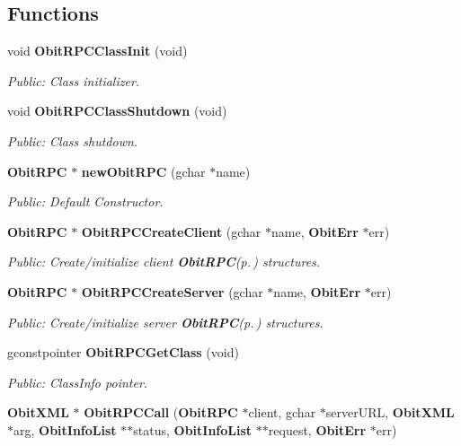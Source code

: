 \subsection*{Functions}
\begin{CompactItemize}
\item 
void {\bf Obit\-RPCClass\-Init} (void)
\begin{CompactList}\small\item\em Public: Class initializer. \item\end{CompactList}\item 
void {\bf Obit\-RPCClass\-Shutdown} (void)
\begin{CompactList}\small\item\em Public: Class shutdown. \item\end{CompactList}\item 
{\bf Obit\-RPC} $\ast$ {\bf new\-Obit\-RPC} (gchar $\ast$name)
\begin{CompactList}\small\item\em Public: Default Constructor. \item\end{CompactList}\item 
{\bf Obit\-RPC} $\ast$ {\bf Obit\-RPCCreate\-Client} (gchar $\ast$name, {\bf Obit\-Err} $\ast$err)
\begin{CompactList}\small\item\em Public: Create/initialize client {\bf Obit\-RPC}{\rm (p.\,\pageref{structObitRPC})} structures. \item\end{CompactList}\item 
{\bf Obit\-RPC} $\ast$ {\bf Obit\-RPCCreate\-Server} (gchar $\ast$name, {\bf Obit\-Err} $\ast$err)
\begin{CompactList}\small\item\em Public: Create/initialize server {\bf Obit\-RPC}{\rm (p.\,\pageref{structObitRPC})} structures. \item\end{CompactList}\item 
gconstpointer {\bf Obit\-RPCGet\-Class} (void)
\begin{CompactList}\small\item\em Public: Class\-Info pointer. \item\end{CompactList}\item 
{\bf Obit\-XML} $\ast$ {\bf Obit\-RPCCall} ({\bf Obit\-RPC} $\ast$client, gchar $\ast$server\-URL, {\bf Obit\-XML} $\ast$arg, {\bf Obit\-Info\-List} $\ast$$\ast$status, {\bf Obit\-Info\-List} $\ast$$\ast$request, {\bf Obit\-Err} $\ast$err)

\end{CompactItemize}
